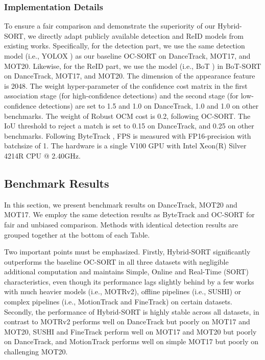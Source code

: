 \documentclass[letterpaper]{article} \usepackage{aaai23}  \usepackage{times}  \usepackage{helvet}  \usepackage{courier}  \usepackage[hyphens]{url}  \usepackage{graphicx} \urlstyle{rm} \def\UrlFont{\rm}  \usepackage{natbib}  \usepackage{caption} \frenchspacing  \setlength{\pdfpagewidth}{8.5in}  \setlength{\pdfpageheight}{11in}  \usepackage{algorithm}
\begin{document}
\subsubsection{Implementation Details}
To ensure a fair comparison and demonstrate the superiority of our Hybrid-SORT, we directly adapt publicly available detection and ReID models from existing works. Specifically, for the detection part, we use the same detection model (i.e., YOLOX \textcolor{blue}{\cite{ge2021yolox}}) as our baseline OC-SORT on DanceTrack, MOT17, and MOT20. Likewise, for the ReID part, we use the model (i.e., BoT \textcolor{blue}{\cite{luo2019strong}}) in BoT-SORT \textcolor{blue}{\cite{aharon2022bot}} on DanceTrack, MOT17, and MOT20. The dimension of the appearance feature is 2048. The weight hyper-parameter of the confidence cost matrix in the first association stage (for high-confidence detections) and the second stage (for low-confidence detections) are set to 1.5 and 1.0 on DanceTrack, 1.0 and 1.0 on other benchmarks. The weight of Robust OCM cost is 0.2, following OC-SORT. The IoU threshold to reject a match is set to 0.15 on DanceTrack, and 0.25 on other benchmarks. Following ByteTrack \textcolor{blue}{\cite{zhang2022bytetrack}}, FPS is measured with FP16-precision \textcolor{blue}{\cite{micikevicius2017mixed}} with batchsize of 1. The hardware is a single V100 GPU with Intel Xeon(R) Silver 4214R CPU @ 2.40GHz.  



\subsection{Benchmark Results}
In this section, we present benchmark results on DanceTrack, MOT20 and MOT17. We employ the same detection results as ByteTrack and OC-SORT for fair and unbiased comparison. Methods with identical detection results are grouped together at the bottom of each Table. 

Two important points must be emphasized. Firstly, Hybrid-SORT significantly outperforms the baseline OC-SORT in all three datasets with negligible additional computation and maintains Simple, Online and Real-Time (SORT) characteristics, even though its performance lags slightly behind by a few works with much heavier models (i.e., MOTRv2), offline pipelines (i.e., SUSHI) or complex pipelines (i.e., MotionTrack and FineTrack) on certain datasets. Secondly, the performance of Hybrid-SORT is highly stable across all datasets, in contrast to MOTRv2 performs well on DanceTrack but poorly on MOT17 and MOT20, SUSHI and FineTrack perform well on MOT17 and MOT20 but poorly on DanceTrack, and MotionTrack performs well on simple MOT17 but poorly on challenging MOT20.
\end{document}
